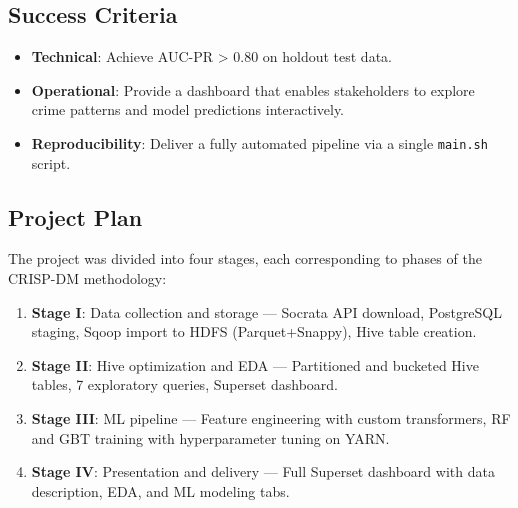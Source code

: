 \subsection{Success Criteria}

\begin{itemize}
    \item \textbf{Technical}: Achieve AUC-PR > 0.80 on holdout test data.
    \item \textbf{Operational}: Provide a dashboard that enables stakeholders to explore crime patterns and model predictions interactively.
    \item \textbf{Reproducibility}: Deliver a fully automated pipeline via a single \texttt{main.sh} script.
\end{itemize}

\subsection{Project Plan}

The project was divided into four stages, each corresponding to phases of the CRISP-DM methodology:

\begin{enumerate}
    \item \textbf{Stage I}: Data collection and storage — Socrata API download, PostgreSQL staging, Sqoop import to HDFS (Parquet+Snappy), Hive table creation.
    \item \textbf{Stage II}: Hive optimization and EDA — Partitioned and bucketed Hive tables, 7 exploratory queries, Superset dashboard.
    \item \textbf{Stage III}: ML pipeline — Feature engineering with custom transformers, RF and GBT training with hyperparameter tuning on YARN.
    \item \textbf{Stage IV}: Presentation and delivery — Full Superset dashboard with data description, EDA, and ML modeling tabs.
\end{enumerate}
